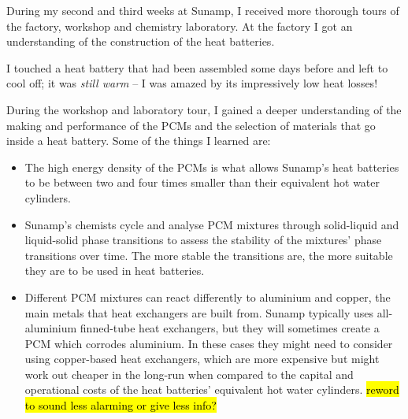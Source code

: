 During my second and third weeks at Sunamp, I received more thorough tours of the factory, workshop and chemistry laboratory.
At the factory I got an understanding of the construction of the heat batteries.

I touched a heat battery that had been assembled some days before and left to cool off; it was \emph{still warm} -- I was amazed by its impressively low heat losses!

During the workshop and laboratory tour, I gained a deeper understanding of the making and performance of the PCMs and the selection of materials that go inside a heat battery.
Some of the things I learned are:
\begin{itemize}
    \item The high energy density of the PCMs is what allows Sunamp's heat batteries to be between two and four times smaller than their equivalent hot water cylinders.
    \item Sunamp's chemists cycle and analyse PCM mixtures through solid-liquid and liquid-solid phase transitions to assess the stability of the mixtures' phase transitions over time. The more stable the transitions are, the more suitable they are to be used in heat batteries.
    \item Different PCM mixtures can react differently to aluminium and copper, the main metals that heat exchangers are built from.
    Sunamp typically uses all-aluminium finned-tube heat exchangers, but they will sometimes create a PCM which corrodes aluminium.
    In these cases they might need to consider using copper-based heat exchangers, which are more expensive but might work out cheaper in the long-run when compared to the capital and operational costs of the heat batteries' equivalent hot water cylinders.
    \hl{reword to sound less alarming or give less info?}
\end{itemize}

